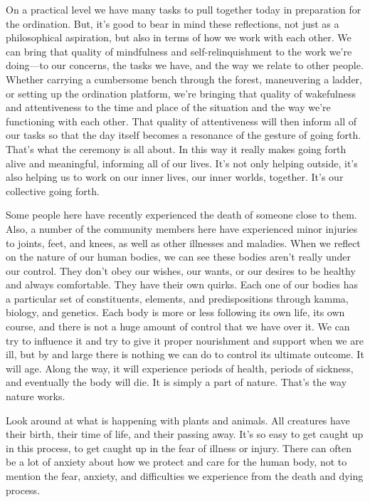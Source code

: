 On a practical level we have many tasks to pull together today in 
preparation for the ordination. But, it's good to bear in mind these 
reflections, not just as a philosophical aspiration, but also in terms 
of how we work with each other. We can bring that quality of 
mindfulness and self-relinquishment to the work we're doing---to our 
concerns, the tasks we have, and the way we relate to other people. 
Whether carrying a cumbersome bench through the forest, maneuvering a 
ladder, or setting up the ordination platform, we're bringing that 
quality of wakefulness and attentiveness to the time and place of the 
situation and the way we're functioning with each other. That quality 
of attentiveness will then inform all of our tasks so that the day 
itself becomes a resonance of the gesture of going forth. That's what 
the ceremony is all about. In this way it really makes going forth 
alive and meaningful, informing all of our lives. It's not only helping 
outside, it's also helping us to work on our inner lives, our inner 
worlds, together. It's our collective going forth.


Some people here have recently experienced the death of someone close 
to them. Also, a number of the community members here have experienced 
minor injuries to joints, feet, and knees, as well as other illnesses 
and maladies. When we reflect on the nature of our human bodies, we can 
see these bodies aren't really under our control. They don't obey our 
wishes, our wants, or our desires to be healthy and always comfortable. 
They have their own quirks. Each one of our bodies has a particular set 
of constituents, elements, and predispositions through kamma, biology, 
and genetics. Each body is more or less following its own life, its own 
course, and there is not a huge amount of control that we have over it. 
We can try to influence it and try to give it proper nourishment and 
support when we are ill, but by and large there is nothing we can do to 
control its ultimate outcome. It will age. Along the way, it will 
experience periods of health, periods of sickness, and eventually the 
body will die. It is simply a part of nature. That's the way nature 
works.

Look around at what is happening with plants and animals. All creatures 
have their birth, their time of life, and their passing away. It's so 
easy to get caught up in this process, to get caught up in the fear of 
illness or injury. There can often be a lot of anxiety about how we 
protect and care for the human body, not to mention the fear, anxiety, 
and difficulties we experience from the death and dying process.

